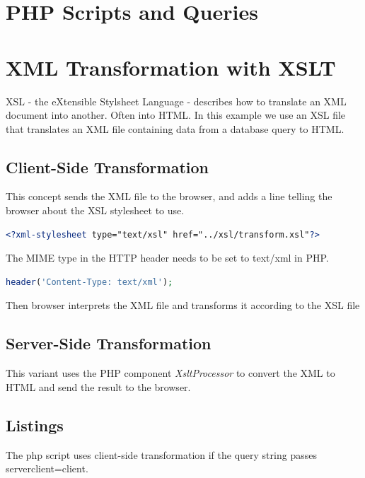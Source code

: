 \documentclass[12pt,a4paper,english]{article}
\begin{document}
\lstset{language=HTML}


\section{PHP Scripts and Queries} \label{sec:php}




\section{XML Transformation with XSLT} \label{sec:xsl}
XSL - the eXtensible Stylsheet Language - describes how to translate an XML document into another.
Often into HTML. In this example we use an XSL file that translates an XML file containing data
from a database query to HTML.

\subsection{Client-Side Transformation}
This concept sends the XML file to the browser, and adds a line telling the browser about
the XSL stylesheet to use.
\begin{lstlisting}[language=XML]
<?xml-stylesheet type="text/xsl" href="../xsl/transform.xsl"?>
\end{lstlisting}
The MIME type in the HTTP header needs to be set to text/xml in PHP. 
\begin{lstlisting}[language=PHP]
header('Content-Type: text/xml');
\end{lstlisting}

Then browser
interprets the XML file and transforms it according to the XSL file

\subsection{Server-Side Transformation}
This variant uses the PHP component \emph{XsltProcessor} to convert the XML to HTML
and send the result to the browser.

\subsection{Listings}
The php script uses client-side transformation if the query string passes serverclient=client.


\end{document}
